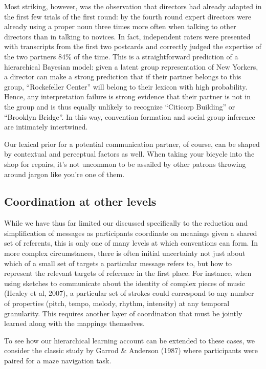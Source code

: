 \documentclass[11pt, floatsintext, man]{apa6}
\begin{document}
Most striking, however, was the observation that directors had already adapted in the first few trials of the first round: by the fourth round expert directors were already using a proper noun three times more often when talking to other directors than in talking to novices. In fact, independent raters were presented with transcripts from the first two postcards and correctly judged the expertise of the two partners 84\% of the time. This is a straightforward prediction of a hierarchical Bayesian model: given a latent group representation of New Yorkers, a director can make a strong prediction that if their partner belongs to this group, ``Rockefeller Center'' will belong to their lexicon with high probability. Hence, any interpretation failure is strong evidence that their partner is not in the group and is thus equally unlikely to recognize ``Citicorp Building'' or ``Brooklyn Bridge''. In this way, convention formation and social group inference are intimately intertwined. 

Our lexical prior for a potential communication partner, of course, can be shaped by contextual and perceptual factors as well. When taking your bicycle into the shop for repairs, it's not uncommon to be assailed by other patrons throwing around jargon like you're one of them. 

\subsection{Coordination at other levels}

While we have thus far limited our discussed specifically to the reduction and simplification of messages as participants coordinate on meanings given a shared set of referents, this is only one of many levels at which conventions can form. In more complex circumstances, there is often initial uncertainty not just about which of a small set of targets a particular message refers to, but how to represent the relevant targets of reference in the first place. For instance, when using sketches to communicate about the identity of complex pieces of music (Healey et al, 2007), a particular set of strokes could correspond to any number of properties (pitch, tempo, melody, rhythm, intensity) at any temporal granularity. This requires another layer of coordination that must be jointly learned along with the mappings themselves. 

To see how our hierarchical learning account can be extended to these cases, we consider the classic study by Garrod \& Anderson (1987) where participants were paired for a maze navigation task. 
\end{document}
